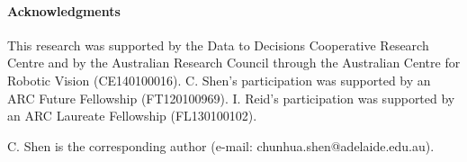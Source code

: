 \documentclass[10pt,twocolumn,letterpaper]{article}
\begin{document}
\paragraph{Acknowledgments}
This research was supported by the Data to Decisions
Cooperative Research Centre and by the Australian Research Council
through the Australian Centre for Robotic Vision (CE140100016).
C. Shen's participation was supported by  an ARC Future Fellowship (FT120100969).
I. Reid's participation was supported by an ARC Laureate Fellowship (FL130100102).


C. Shen is the corresponding author (e-mail: chunhua.shen@adelaide.edu.au).




{\small


}
\end{document}
